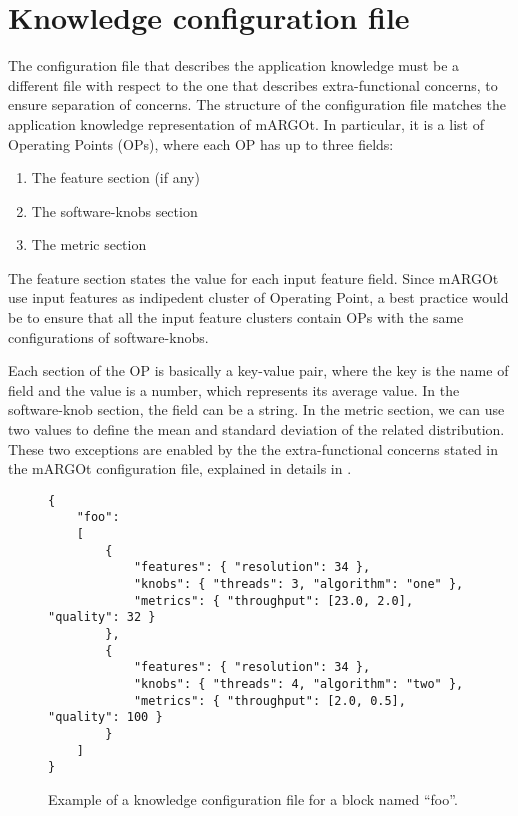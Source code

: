 \section{Knowledge configuration file}
\label{sec:knowledge}


The configuration file that describes the application knowledge must be a different file with respect to the one that describes extra-functional concerns, to ensure separation of concerns.
The structure of the configuration file matches the application knowledge representation of mARGOt.
In particular, it is a list of Operating Points (OPs), where each OP has up to three fields:
\begin{enumerate}
	\item The feature section (if any)
	\item The software-knobs section
	\item The metric section
\end{enumerate}
The feature section states the value for each input feature field.
Since mARGOt use input features as indipedent cluster of Operating Point, a best practice would be to ensure that all the input feature clusters contain OPs with the same configurations of software-knobs.

Each section of the OP is basically a key-value pair, where the key is the name of field and the value is a number, which represents its average value.
In the software-knob section, the field can be a string.
In the metric section, we can use two values to define the mean and standard deviation of the related distribution.
These two exceptions are enabled by the the extra-functional concerns stated in the mARGOt configuration file, explained in details in .

\begin{figure}
\lstset{language=json}
\begin{lstlisting}
{
	"foo":
	[
		{
			"features": { "resolution": 34 },
			"knobs": { "threads": 3, "algorithm": "one" },
			"metrics": { "throughput": [23.0, 2.0], "quality": 32 }
		},
		{
			"features": { "resolution": 34 },
			"knobs": { "threads": 4, "algorithm": "two" },
			"metrics": { "throughput": [2.0, 0.5], "quality": 100 }
		}
	]
}
\end{lstlisting}
\caption{Example of a knowledge configuration file for a block named ``foo''.}
\label{code:knowledge_file}
\end{figure}


